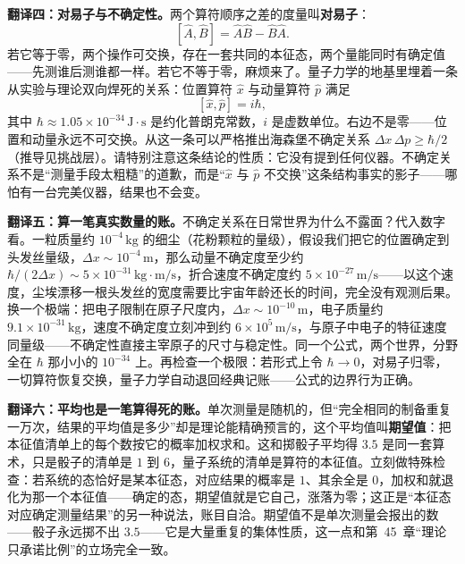 \textbf{翻译四：对易子与不确定性。}两个算符顺序之差的度量叫\textbf{对易子}：
\[
[\hat{A},\hat{B}]=\hat{A}\hat{B}-\hat{B}\hat{A}.
\]
若它等于零，两个操作可交换，存在一套共同的本征态，两个量能同时有确定值——先测谁后测谁都一样。若它不等于零，麻烦来了。量子力学的地基里埋着一条从实验与理论双向焊死的关系：位置算符 $\hat{x}$ 与动量算符 $\hat{p}$ 满足
\[
[\hat{x},\hat{p}]=i\hbar,
\]
其中 $\hbar\approx1.05\times10^{-34}\,\mathrm{J\cdot s}$ 是约化普朗克常数，$i$ 是虚数单位。右边不是零——位置和动量永远不可交换。从这一条可以严格推出海森堡不确定关系 $\Delta x\,\Delta p\geq\hbar/2$（推导见挑战层）。请特别注意这条结论的性质：它没有提到任何仪器。不确定关系不是“测量手段太粗糙”的道歉，而是“$\hat{x}$ 与 $\hat{p}$ 不交换”这条结构事实的影子——哪怕有一台完美仪器，结果也不会变。

\textbf{翻译五：算一笔真实数量的账。}不确定关系在日常世界为什么不露面？代入数字看。一粒质量约 $10^{-4}\,\mathrm{kg}$ 的细尘（花粉颗粒的量级），假设我们把它的位置确定到头发丝量级，$\Delta x\sim10^{-4}\,\mathrm{m}$，那么动量不确定度至少约 $\hbar/(2\Delta x)\sim5\times10^{-31}\,\mathrm{kg\cdot m/s}$，折合速度不确定度约 $5\times10^{-27}\,\mathrm{m/s}$——以这个速度，尘埃漂移一根头发丝的宽度需要比宇宙年龄还长的时间，完全没有观测后果。换一个极端：把电子限制在原子尺度内，$\Delta x\sim10^{-10}\,\mathrm{m}$，电子质量约 $9.1\times10^{-31}\,\mathrm{kg}$，速度不确定度立刻冲到约 $6\times10^{5}\,\mathrm{m/s}$，与原子中电子的特征速度同量级——不确定性直接主宰原子的尺寸与稳定性。同一个公式，两个世界，分野全在 $\hbar$ 那小小的 $10^{-34}$ 上。再检查一个极限：若形式上令 $\hbar\to0$，对易子归零，一切算符恢复交换，量子力学自动退回经典记账——公式的边界行为正确。

\textbf{翻译六：平均也是一笔算得死的账。}单次测量是随机的，但“完全相同的制备重复一万次，结果的平均值是多少”却是理论能精确预言的，这个平均值叫\textbf{期望值}：把本征值清单上的每个数按它的概率加权求和。这和掷骰子平均得 $3.5$ 是同一套算术，只是骰子的清单是 $1$ 到 $6$，量子系统的清单是算符的本征值。立刻做特殊检查：若系统的态恰好是某本征态，对应结果的概率是 $1$、其余全是 $0$，加权和就退化为那一个本征值——确定的态，期望值就是它自己，涨落为零；这正是“本征态对应确定测量结果”的另一种说法，账目自洽。期望值不是单次测量会报出的数——骰子永远掷不出 $3.5$——它是大量重复的集体性质，这一点和第~45~章“理论只承诺比例”的立场完全一致。


